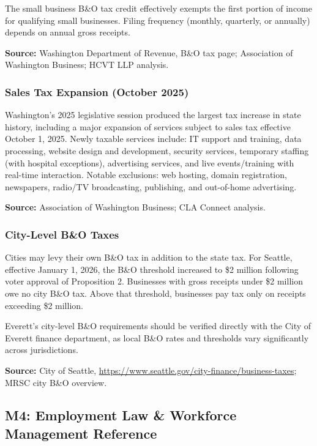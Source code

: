 \documentclass[11pt,letterpaper]{article}
\begin{document}
The small business B\&O tax credit effectively exempts the first portion of income for qualifying small businesses. Filing frequency (monthly, quarterly, or annually) depends on annual gross receipts.

\textbf{Source:} Washington Department of Revenue, B\&O tax page; Association of Washington Business; HCVT LLP analysis.

\subsubsection{Sales Tax Expansion (October 2025)}

Washington's 2025 legislative session produced the largest tax increase in state history, including a major expansion of services subject to sales tax effective October 1, 2025. Newly taxable services include: IT support and training, data processing, website design and development, security services, temporary staffing (with hospital exceptions), advertising services, and live events/training with real-time interaction. Notable exclusions: web hosting, domain registration, newspapers, radio/TV broadcasting, publishing, and out-of-home advertising.

\textbf{Source:} Association of Washington Business; CLA Connect analysis.

\subsubsection{City-Level B\&O Taxes}

Cities may levy their own B\&O tax in addition to the state tax. For Seattle, effective January 1, 2026, the B\&O threshold increased to \$2 million following voter approval of Proposition 2. Businesses with gross receipts under \$2 million owe no city B\&O tax. Above that threshold, businesses pay tax only on receipts exceeding \$2 million.

Everett's city-level B\&O requirements should be verified directly with the City of Everett finance department, as local B\&O rates and thresholds vary significantly across jurisdictions.

\textbf{Source:} City of Seattle, \url{https://www.seattle.gov/city-finance/business-taxes}; MRSC city B\&O overview.

\subsection{M4: Employment Law \& Workforce Management Reference}
\end{document}

